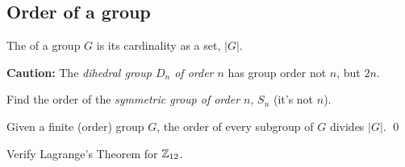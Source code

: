 \documentclass[../algebraNotesMSRI-UP2016.tex]{subfiles}
\begin{document}
\subsection[\subsecname]{Order of a group}
\begin{frame}[c]{\subsecname}
\begin{dfn}
The  of a group $G$ is its cardinality as a set, $|G|$.
\end{dfn}

\smallGap
\textbf{Caution:} The \emph{dihedral group $D_n$ of order $n$} has group order not $n$, but $2n$.  

\smallGap
\begin{exe}\label{exe:orderOfSn}
Find the order of the \emph{symmetric group of order $n$}, $S_n$ (it's not $n$).
\end{exe}  
\end{frame}

\begin{frame}[c]
\begin{thm}\label{thm:Lagrange}
Given a finite (order) group $G$, the order of every subgroup of $G$ divides $|G|$.
\qed
\end{thm}

\smallGap
\begin{que}
Verify Lagrange's Theorem for $\mathbb Z_{12}$. 
\end{que}
\end{frame}
\end{document}
